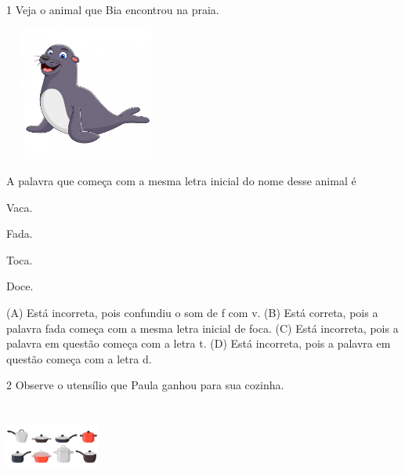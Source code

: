 \num{1} Veja o animal que Bia encontrou na praia.

\includegraphics[width=2.16528in,height=1.72778in]{media/image139.jpeg}


A palavra que começa com a mesma letra inicial do nome desse animal é

\begin{minipage}{.5\textwidth}
\begin{escolha}
\item Vaca.

\item Fada.

\item Toca.

\item Doce.
\end{escolha}
\end{minipage}

(A) Está incorreta, pois confundiu o som de f com v.
(B) Está correta, pois a palavra fada começa com a mesma letra inicial de foca.
(C) Está incorreta, pois a palavra em questão começa com a letra t.
(D) Está incorreta, pois a palavra em questão começa com a letra d.

\num{2} Observe o utensílio que Paula ganhou para sua cozinha.

\includegraphics[width=1.22222in,height=1.11389in]{media/image19.jpeg}

